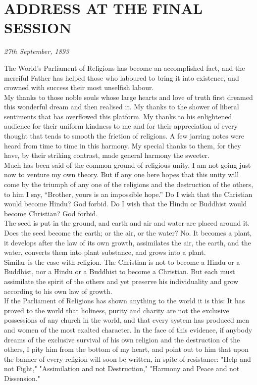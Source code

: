 \section{ADDRESS AT THE FINAL SESSION}
\begin{center}\textit{ \textit{27th September, 1893}}\end{center}

The World's Parliament of Religions has become an accomplished
fact, and the merciful Father has helped those who laboured to bring it
into existence, and crowned with success their most unselfish labour.\\

My thanks to those noble souls whose large hearts and love of
truth first dreamed this wonderful dream and then realised it. My
thanks to the shower of liberal sentiments that has overflowed this
platform. My thanks to his enlightened audience for their uniform
kindness to me and for their appreciation of every thought that tends
to smooth the friction of religions. A few jarring notes were heard
from time to time in this harmony. My special
thanks to them, for they have, by
their striking contrast, made general harmony the sweeter.\\

Much has been said of the common ground of religious unity. I
am not going just now to venture my own theory. But if any one here
hopes that this unity will come by the triumph of any one of the
religions and the destruction of the others, to him I say, “Brother,
yours is an impossible hope.” Do I wish that the Christian would become
Hindu? God forbid. Do I wish that the Hindu or Buddhist would become
Christian? God forbid.\\

The seed is put in the ground, and earth and air and water are
placed around it. Does the seed become the earth; or the air, or the
water? No. It becomes a plant, it develops after the law of its own
growth, assimilates the air, the earth, and the water, converts them
into plant substance, and grows into a plant.\\

Similar is the case with religion. The Christian is not to
become a Hindu or a Buddhist, nor a Hindu or a Buddhist to become a
Christian. But each must assimilate the spirit of the others and yet
preserve his individuality and grow according to his own law of growth.\\

If the Parliament of Religions has shown anything to the world
it is this: It has proved to the world that holiness, purity and
charity are not the exclusive possessions of any church in the world,
and that every system has produced men and women of the most exalted
character. In the face of this evidence, if anybody dreams of the
exclusive survival of his own religion and the destruction of the
others, I pity him from the bottom of my heart, and point out to him
that upon the banner of every religion will soon be written, in spite
of resistance: "Help and not Fight," "Assimilation and not
Destruction," "Harmony and Peace and not Dissension."\\

